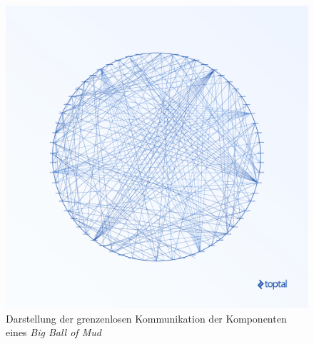     \begin{figure}[ht]
        \vspace{.02\textheight}
        \centering
        \includegraphics[width=.5\textwidth]{res/img/bigballofmud.png}
        \caption{Darstellung der grenzenlosen Kommunikation der Komponenten eines \emph{Big Ball of Mud} \parencite{Gadzinowski2017bigballofmud}}
        \label{fig:bigballofmud}
    \end{figure}

